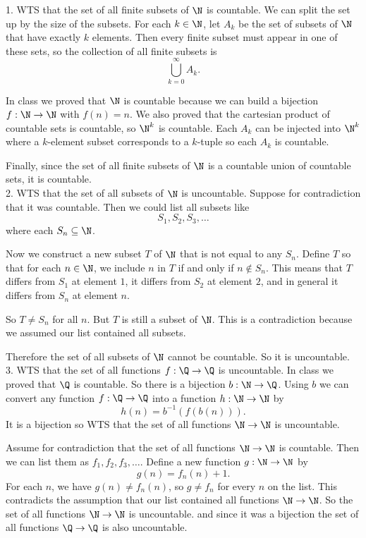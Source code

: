\documentclass{report}
\begin{document}
\begin{proofWithHibiscus}
  1. WTS that the set of all finite subsets of $\N$ is countable. 
  We can split the set up by the size of the subsets. 
  For each $k \in \N$, let $A_k$ be the set of subsets of $\N$ that have exactly $k$ elements. 
  Then every finite subset must appear in one of these sets, so the collection of all finite subsets is 
  \[
    \bigcup_{k=0}^\infty A_k.
  \]
  
  In class we proved that $\N$ is countable because we can build a bijection $f:\N\to\N$ with $f(n)=n$. 
  We also proved that the cartesian product of countable sets is countable, so $\N^k$ is countable. 
  Each $A_k$ can be injected into $\N^k$ where a $k$-element subset corresponds to a $k$-tuple 
  so each $A_k$ is countable. 
  
  Finally, since the set of all finite subsets of $\N$ is a countable union of countable sets, 
  it is countable. \\

  2.   WTS that the set of all subsets of $\N$ is uncountable. 
  Suppose for contradiction that it was countable. Then we could list all subsets like
  \[
    S_1, S_2, S_3, \dots
  \]
  where each $S_n \subseteq \N$. 

  Now we construct a new subset $T$ of $\N$ that is not equal to any $S_n$. 
  Define $T$ so that for each $n \in \N$, we include $n$ in $T$ if and only if $n \notin S_n$. 
  This means that $T$ differs from $S_1$ at element $1$, it differs from $S_2$ at element $2$, and in general it differs from $S_n$ at element $n$. 

  So $T \neq S_n$ for all $n$. But $T$ is still a subset of $\N$. 
  This is a contradiction because we assumed our list contained all subsets. 

  Therefore the set of all subsets of $\N$ cannot be countable. 
  So it is uncountable. \\

  3.  WTS that the set of all functions $f:\Q\to\Q$ is uncountable. 
  In class we proved that $\Q$ is countable. So there is a bijection $b:\N\to\Q$. 
  Using $b$ we can convert any function $f:\Q\to\Q$ into a function $h:\N\to\N$ by
  \[
    h(n)=b^{-1}(f(b(n))).
  \]
  It is a bijection so WTS that the set of all functions $\N\to\N$ is uncountable.
  
  Assume for contradiction that the set of all functions $\N\to\N$ is countable. 
  Then we can list them as $f_1,f_2,f_3,\dots$. 
  Define a new function $g:\N\to\N$ by
  \[
    g(n)=f_n(n)+1.
  \]
  For each $n$, we have $g(n)\neq f_n(n)$, so $g\neq f_n$ for every $n$ on the list. 
  This contradicts the assumption that our list contained all functions $\N\to\N$. So the set of all functions $\N\to\N$ is uncountable. 
  and since it was a bijection the set of all functions $\Q\to\Q$ is also uncountable.
\end{proofWithHibiscus}
\end{document}
